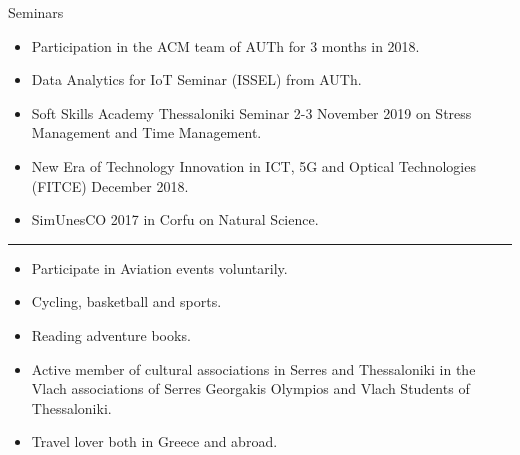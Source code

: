 \documentclass[a4paper,10pt]{article}
\newlength{\cvcolumngapwidth}
\newlength{\cvleftcolumnwidth}
\newlength{\cvrightcolumnwidth}
\newcommand{\cvsectionstyle}[1]{{\normalsize\cvsectionfont\textcolor{cvsectioncolor}{#1}}}
\newcommand{\cvheadingstyle}[1]{{\normalsize\cvheadingfont\textcolor{cvheadingcolor}{#1}}}
\newlength{\cvafteritemskipamount}
\newlength{\cvaftersectionskipamount}
\newlength{\cvparskip}
\newcommand{\cvsection}[1]{
    \begin{minipage}[t]{\cvleftcolumnwidth}
        \raggedleft\cvsectionstyle{#1}
    \end{minipage}%
    \hspace{\cvcolumngapwidth}%
    \begin{minipage}[t]{\cvrightcolumnwidth}
        \textcolor{cvrulecolor}{\rule{\cvrightcolumnwidth}{0.3mm}}
    \end{minipage}

    \vspace{\cvaftersectionskipamount}
}
\newcommand{\cvitem}[2]{
    \begin{minipage}[t]{\cvleftcolumnwidth}
        \raggedleft #1
    \end{minipage}%
    \hspace{\cvcolumngapwidth}%
    \begin{minipage}[t]{\cvrightcolumnwidth}
        \setlength{\parskip}{\cvparskip} #2
    \end{minipage}

    \vspace{\cvafteritemskipamount}
}
\begin{document}
\cvitem{
    \cvheadingstyle{Seminars}
}{
   
    \begin{itemize}
       \item Participation in the ACM team of AUTh for 3 months in 2018.
        \item Data Analytics for IoT Seminar (ISSEL) from AUTh.
        \item Soft Skills Academy Thessaloniki Seminar
2-3 November 2019 on Stress Management and Time Management.

        \item New Era of Technology Innovation in ICT, 5G and Optical Technologies (FITCE) December 2018.
        \item SimUnesCO 2017 in Corfu on Natural Science.

    \end{itemize}
  
}


\cvsection{Activities-Interests}
\begin {itemize} [leftmargin = 150pt]
    \item Participate in  Aviation events voluntarily.
\end {itemize}

\begin {itemize} [leftmargin = 150pt]
    \item Cycling, basketball and sports.
\end {itemize}
\begin {itemize} [leftmargin = 150pt]
    \item Reading adventure books.
\end {itemize}
\begin {itemize} [leftmargin = 150pt]
    \item Active member of cultural associations in Serres and Thessaloniki in the Vlach associations of Serres Georgakis Olympios and Vlach Students of Thessaloniki.
\end {itemize}
\begin {itemize} [leftmargin = 150pt]
    \item Travel lover both in Greece and abroad.
\end {itemize}
\end{document}
